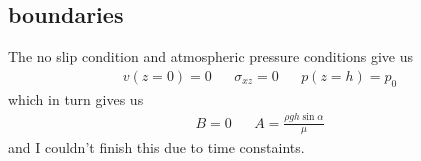 \subsection{boundaries}
The no slip condition and atmospheric pressure conditions give us
\begin{align}
    v(z=0)=0 && \sigma_{xz}=0 && p(z=h)=p_0
\end{align}
which in turn gives us
\begin{align}
    B=0 && A=\frac{\rho g h \sin\alpha}{\mu}
\end{align}
and I couldn't finish this due to time constaints.